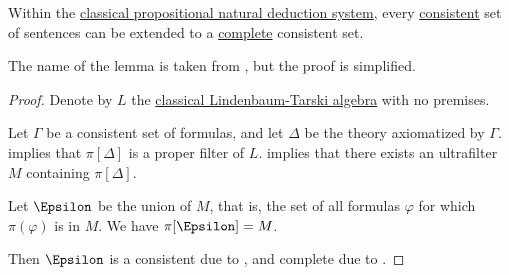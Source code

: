 \begin{lemma}\label{thm:extension_to_complete_consistent_set}
  Within the \hyperref[def:abstract_natural_deduction_system]{classical propositional natural deduction system}, every \hyperref[def:consistent_set_of_sentences]{consistent} set of sentences can be extended to a \hyperref[def:complete_set_of_sentences]{complete} consistent set.
\end{lemma}
\begin{comments}
  \item The name of the lemma is taken from , but the proof is simplified.
\end{comments}
\begin{proof}
  Denote by \( L \) the \hyperref[thm:lindenbaum_tarski_algebras]{classical Lindenbaum-Tarski algebra} with no premises.

  Let \( \Gamma \) be a consistent set of formulas, and let \( \Delta \) be the theory axiomatized by \( \Gamma \).  implies that \( \pi[\Delta] \) is a proper filter of \( L \).  implies that there exists an ultrafilter \( M \) containing \( \pi[\Delta] \).

  Let \( \Epsilon \) be the union of \( M \), that is, the set of all formulas \( \varphi \) for which \( \pi(\varphi) \) is in \( M \). We have \( \pi[\Epsilon] = M \).

  Then \( \Epsilon \) is a consistent due to , and complete due to .
\end{proof}


